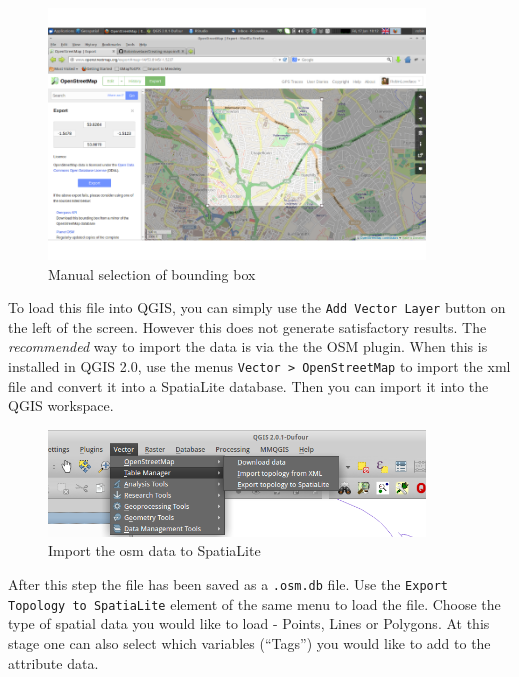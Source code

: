 \documentclass[]{article}
\let\Oldincludegraphics\includegraphics
\renewcommand{\includegraphics}[1]{\Oldincludegraphics[width=10cm]{#1}}
\begin{document}
\begin{figure}[htbp]
\centering
\includegraphics{figure/Manual_selection_of_bounding_box.png}
\caption{Manual selection of bounding box}
\end{figure}

To load this file into QGIS, you can simply use the
\texttt{Add Vector Layer} button on the left of the screen. However this
does not generate satisfactory results. The \emph{recommended} way to
import the data is via the the OSM plugin. When this is installed in
QGIS 2.0, use the menus \texttt{Vector \textgreater{} OpenStreetMap} to
import the xml file and convert it into a SpatiaLite database. Then you
can import it into the QGIS workspace.

\begin{figure}[htbp]
\centering
\includegraphics{osmfigs/import-osm.png}
\caption{Import the osm data to SpatiaLite}
\end{figure}

After this step the file has been saved as a \texttt{.osm.db} file. Use
the \texttt{Export Topology to SpatiaLite} element of the same menu to
load the file. Choose the type of spatial data you would like to load -
Points, Lines or Polygons. At this stage one can also select which
variables (``Tags'') you would like to add to the attribute data.
\end{document}
